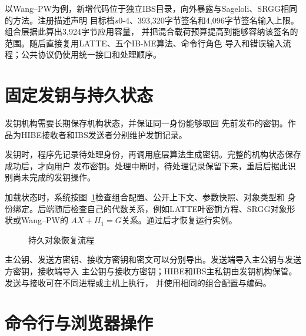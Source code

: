 以Wang--PW为例，新增代码位于独立IBS目录，向外暴露与Sageloli、SRGG相同的方法。注册描述声明
目标档$s0$-4、393,320字节签名和4,096字节签名输入上限。组合层据此算出3,924字节应用容量，
并把混合载荷预算提高到能够容纳该签名的范围。随后直接复用LATTE、五个IB-ME算法、命令行角色
导入和错误输入流程；公共协议仍使用统一接口和处理顺序。



\section{固定发钥与持久状态}

发钥机构需要长期保存机构状态，并保证同一身份能够取回
先前发布的密钥。作品为HIBE接收者和IBS发送者分别维护发钥记录。

发钥时，程序先记录待处理身份，再调用底层算法生成密钥。完整的机构状态保存成功后，才向用户
发布密钥。处理中断时，待处理记录保留下来，重启后据此识别尚未完成的发钥操作。

加载状态时，系统按图~\ref{fig:state-recovery}检查组合配置、公开上下文、参数快照、对象类型和
身份绑定。后端随后检查自己的代数关系，例如LATTE叶密钥方程、SRGG对象形状或Wang--PW的
$AX+H_1=G$关系。通过后才恢复运行实例。

\begin{figure}[H]
\centering
{}
\caption{持久对象恢复流程}
\label{fig:state-recovery}
\end{figure}

主公钥、发送方密钥、接收方密钥和密文可以分别导出。发送端导入主公钥与发送方密钥，接收端导入
主公钥与接收方密钥；HIBE和IBS主私钥由发钥机构保管。发送与接收可在不同进程或主机上执行，
并使用相同的组合配置与编码。

\section{命令行与浏览器操作}

